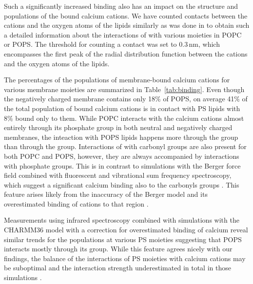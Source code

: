 \documentclass[journal=jpcbfk,manuscript=article]{achemso}
\begin{document}
Such a significantly increased binding also has an impact 
on the structure and populations of the bound calcium cations. 
We have counted contacts between the cations and the oxygen atoms of the lipids
similarly as was done in \cite{melcr18} 
to obtain such a detailed information 
about the interactions of  with various moieties in POPC or POPS. 
The threshold for counting a contact was set to $0.3\,\mathrm{nm}$, 
which encompasses the first peak of the radial distribution function between the cations and the oxygen atoms of the lipids. 

The percentages of the populations of membrane-bound calcium cations for various membrane moieties 
are summarized in Table~\ref{tab:binding}.
Even though the negatively charged membrane contains only 18\% of POPS, 
on average 41\% of the total population of bound calcium cations is in contact with PS lipids
with 8\% bound only to them. 
While POPC interacts with the calcium cations almost entirely through its phosphate group 
in both neutral \cite{melcr18} and negatively charged membranes, 
the inteaction with POPS lipids happens more through the  group than through the  group. 
Interactions of  with carbonyl groups are also present for both POPC and POPS,
however, they are always accompanied by interactions with phosphate groups. 
This is in contrast to 
simulations with the Berger force field \cite{berger97,mukhopadhyay04}
combined with fluorescent and vibrational sum frequency spectroscopy,
which suggest a significant
calcium binding also to the carbonyls groups \cite{melcrova16}. 
This feature arises likely from the inaccuracy of the Berger model 
and its overestimated binding of cations to that region \cite{nmrlipids_proj4}. 

Measurements using infrared spectroscopy 
combined with simulations with the CHARMM36 model 
with a correction for overestimated binding of calcium \cite{valentine18}
reveal similar trends for the populations at various PS moieties
suggesting that POPS interacts mostly through its  group. 
While this feature agrees nicely with our findings, 
the balance of the interactions of PS moieties with calcium cations may be suboptimal
and the interaction strength underestimated in total in those simulations \cite{nmrlipids_proj4}. 
\end{document}
